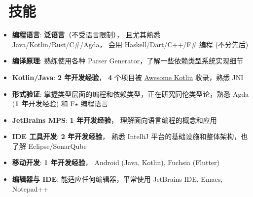 \documentclass{resume}
\begin{document}
\section{\faCogs\ 技能}
\begin{itemize}[parsep=0.25ex]
  \item \textbf{编程语言}:
    \textbf{泛语言}（不受语言限制），
    且尤其熟悉 Java/Kotlin/Rust/C\#/Agda，
    会用 Haskell/Dart/C++/F\# 编程 (不分先后)

  \item \textbf{编译原理}:
    熟练使用各种 Parser Generator，了解一些依赖类型系统实现细节

  \item \textbf{Kotlin/Java}:
    \textbf{2 年开发经验}，
    \textbf{4} 个项目被
    \href{https://kotlin.link/?q=ice} {Awesome Kotlin}
    收录，熟悉 JNI

  \item \textbf{形式验证}:
    掌握类型层面的编程和依赖类型，正在研究同伦类型论，熟悉 Agda (\textbf{1 年}开发经验) 和 F$\star$ 编程语言

  \item \textbf{JetBrains MPS}:
    \textbf{1 年开发经验}，
    理解面向语言编程的概念和应用

  \item \textbf{IDE 工具开发}:
    \textbf{2 年开发经验}，
    熟悉 IntelliJ 平台的基础设施和整体架构，也了解 Eclipse/SonarQube

  \item \textbf{移动开发}:
    \textbf{1 年开发经验}，
    Android (Java, Kotlin), Fuchsia (Flutter)

  \item \textbf{编辑器与 IDE}:
    能适应任何编辑器，平常使用 JetBrains IDE, Emacs, Notepad++
\end{itemize}

\end{document}
